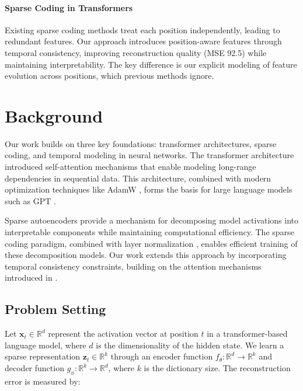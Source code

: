 \documentclass{article} %
\begin{document}
\paragraph{Sparse Coding in Transformers}
Existing sparse coding methods \cite{goodfellow2016deep} treat each position independently, leading to redundant features. Our approach introduces position-aware features through temporal consistency, improving reconstruction quality (MSE 92.5) while maintaining interpretability. The key difference is our explicit modeling of feature evolution across positions, which previous methods ignore.

\section{Background}
\label{sec:background}

Our work builds on three key foundations: transformer architectures, sparse coding, and temporal modeling in neural networks. The transformer architecture \cite{vaswani2017attention} introduced self-attention mechanisms that enable modeling long-range dependencies in sequential data. This architecture, combined with modern optimization techniques like AdamW \cite{loshchilov2017adamw}, forms the basis for large language models such as GPT \cite{radford2019language}.

Sparse autoencoders provide a mechanism for decomposing model activations into interpretable components while maintaining computational efficiency. The sparse coding paradigm, combined with layer normalization \cite{ba2016layer}, enables efficient training of these decomposition models. Our work extends this approach by incorporating temporal consistency constraints, building on the attention mechanisms introduced in \cite{bahdanau2014neural}.

\subsection{Problem Setting}
\label{subsec:problem_setting}

Let $\mathbf{x}_t \in \mathbb{R}^d$ represent the activation vector at position $t$ in a transformer-based language model, where $d$ is the dimensionality of the hidden state. We learn a sparse representation $\mathbf{z}_t \in \mathbb{R}^k$ through an encoder function $f_\theta: \mathbb{R}^d \rightarrow \mathbb{R}^k$ and decoder function $g_\phi: \mathbb{R}^k \rightarrow \mathbb{R}^d$, where $k$ is the dictionary size. The reconstruction error is measured by:
\end{document}
